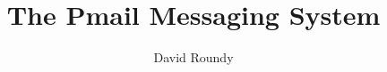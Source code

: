 \documentclass[letterpaper,twocolumn,amsmath,amssymb,pre,aps,10pt]{revtex4-1}
\begin{document}
\title{The Pmail Messaging System}
\author{David Roundy}

\maketitle

\end{document}
